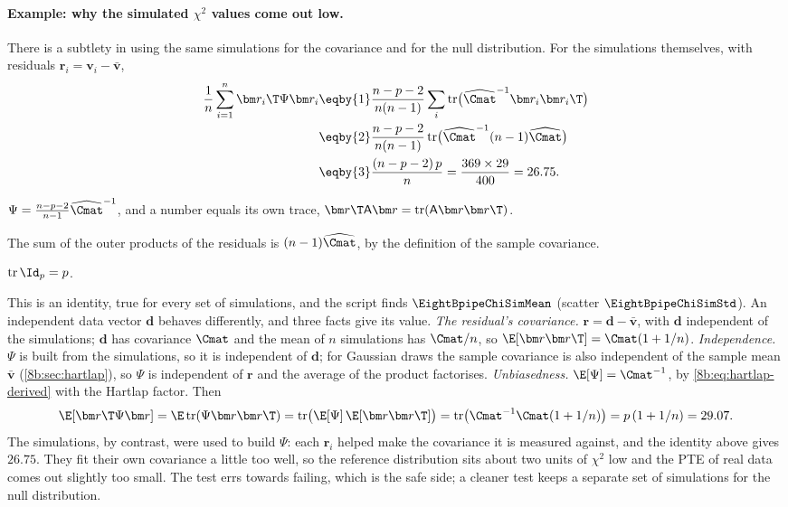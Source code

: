 \paragraph{Example: why the simulated $\chi^2$ values come out low.}
There is a subtlety in using the same simulations for the covariance and for the null distribution.
For the simulations themselves, with residuals $\bm r_i=\bm v_i-\bar{\bm v}$,
\begin{align*}
  \frac1n\sum_{i=1}^n\bm r_i\T\Psi\bm r_i
  &\eqby{1}\frac{n-p-2}{n(n-1)}\sum_i\operatorname{tr}\bigl(\widehat\Cmat^{-1}\bm r_i\bm r_i\T\bigr)\\
  &\eqby{2}\frac{n-p-2}{n(n-1)}\operatorname{tr}\bigl(\widehat\Cmat^{-1}(n-1)\widehat\Cmat\bigr)\\
  &\eqby{3}\frac{(n-p-2)\,p}{n}
  =\frac{369\times29}{400}=26.75 .
\end{align*}
\begin{explain}
  \item $\Psi=\frac{n-p-2}{n-1}\widehat\Cmat^{-1}$, and a number equals its own trace,
        $\bm r\T\mathsf A\bm r=\operatorname{tr}(\mathsf A\bm r\bm r\T)$.
  \item The sum of the outer products of the residuals is $(n-1)\widehat\Cmat$, by the definition of the
        sample covariance.
  \item $\operatorname{tr}\Id_p=p$.
\end{explain}
This is an identity, true for every set of simulations, and the script finds $\EightBpipeChiSimMean$ (scatter
$\EightBpipeChiSimStd$). An independent data vector $\bm d$ behaves differently, and three facts give its value.
\emph{The residual's covariance.} $\bm r=\bm d-\bar{\bm v}$, with $\bm d$ independent of the simulations; $\bm d$ has
covariance $\Cmat$ and the mean of $n$ simulations has $\Cmat/n$, so $\E[\bm r\bm r\T]=\Cmat(1+1/n)$.
\emph{Independence.} $\Psi$ is built from the simulations, so it is independent of $\bm d$; for Gaussian draws
the sample covariance is also independent of the sample mean $\bar{\bm v}$ (\cref{8b:sec:hartlap}), so $\Psi$ is
independent of $\bm r$ and the average of the product factorises.
\emph{Unbiasedness.} $\E[\Psi]=\Cmat^{-1}$, by \eqref{8b:eq:hartlap-derived} with the Hartlap factor. Then
\[
  \E[\bm r\T\Psi\bm r]=\E\operatorname{tr}(\Psi\bm r\bm r\T)=\operatorname{tr}\bigl(\E[\Psi]\,\E[\bm r\bm r\T]\bigr)
  =\operatorname{tr}\bigl(\Cmat^{-1}\Cmat(1+1/n)\bigr)=p\,(1+1/n)=29.07 .
\]
The simulations, by contrast, were used to build $\Psi$: each $\bm r_i$ helped make the covariance it is
measured against, and the identity above gives $26.75$. They fit their own covariance a little too
well, so the reference distribution sits about two units of $\chi^2$ low and the PTE of real data comes
out slightly too small. The test errs towards
failing, which is the safe side; a cleaner test keeps a separate set of simulations for the null
distribution.

